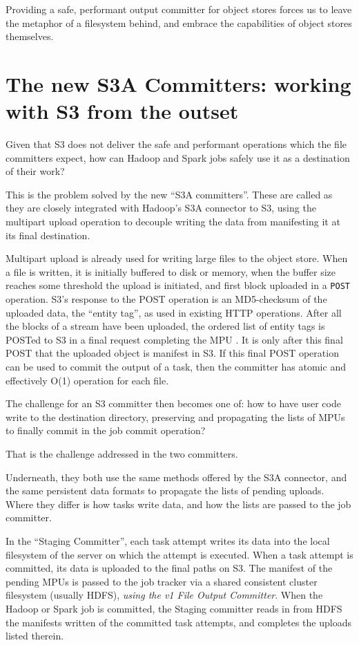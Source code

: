 \documentclass[conference]{IEEEtran}
\begin{document}
Providing a safe, performant output committer for object stores forces
us to leave the metaphor of a filesystem behind, and embrace
the capabilities of object stores themselves.


\section{The new S3A Committers: working with S3 from the outset}
\label{sec:new-committers}


Given that S3 does not deliver the safe and performant operations
which the file committers expect, how can Hadoop and Spark
jobs safely use it as a destination of their work?

This is the problem solved by the new ``S3A committers''.
These are called as they are closely integrated with Hadoop's S3A connector to S3,
using the multipart upload operation to decouple writing the data from
manifesting it at its final destination.

Multipart upload is already used for writing large files to the object store.
When a file is written, it is initially buffered to disk or memory, when the
buffer size reaches some threshold the upload is initiated, and first block uploaded
in a \texttt{POST} operation.
S3's response to the POST operation is an MD5-checksum of the
uploaded data, the ``entity tag'', as used in existing HTTP operations.
After all the blocks of a stream have been uploaded, the ordered list
of entity tags is POSTed to S3 in a final request completing the MPU .
It is only after this final POST that the uploaded object is manifest in S3.
If this final POST operation can be used to commit the output of a task,
then the committer has atomic and effectively O(1) operation for each file.

The challenge for an S3 committer then becomes one of: how to have
user code write to the destination directory, preserving and propagating
the lists of MPUs to finally commit in the job commit operation?

That is the challenge addressed in the two committers.

Underneath, they both use the same methods offered by the S3A connector,
and the same persistent data formats to propagate the lists of pending uploads.
Where they differ is how tasks write data, and how the lists are passed
to the job committer.

In the ``Staging Committer'', each task attempt writes its data into the local
filesystem of the server on which the attempt is executed.
When a task attempt is committed, its data is uploaded to the final
paths on S3.
The manifest of the pending MPUs is passed to the job tracker via
a shared consistent cluster filesystem (usually HDFS), \emph{using the v1
File Output Committer}.
When the Hadoop or Spark job is committed, the Staging committer reads in
from HDFS the manifests written of the committed task attempts, and
completes the uploads listed therein.
\end{document}
